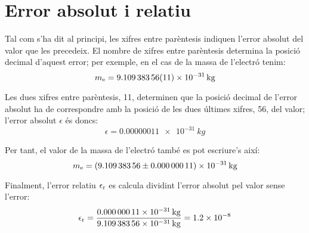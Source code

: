 \section{Error absolut i relatiu}\label{err_abs_rel}

Tal com s'ha dit al principi, les xifres entre parèntesis indiquen l'error absolut del valor que les precedeix. El nombre de xifres entre parèntesis determina la posició decimal d'aquest error; per exemple, en el cas de la  massa de l'electró tenim:
\[
    m\ped{e} = \SI{9,10938356(11) e-31}{kg}
\]

Les dues xifres entre parèntesis, 11, determinen que la posició decimal de l'error absolut ha de correspondre amb la posició de les dues últimes xifres, 56, del valor; l'error absolut $\epsilon$  és doncs:
\[
    \epsilon = \SI{0,00000011 e-31}{kg}
\]

Per tant, el valor de la massa de l'electró també es pot escriure's així:
 \[
    m\ped{e} = \SI[separate-uncertainty]{9,10938356(11) e-31}{kg}
\]

Finalment, l'error relatiu $\epsilon\ped{r}$ es calcula dividint l'error absolut pel valor sense l'error:
\[
    \epsilon\ped{r} = \frac{\SI{0,00000011 e-31}{kg}}{\SI{9,10938356 e-31}{kg}} =   \num{1,2e-8}
\]
